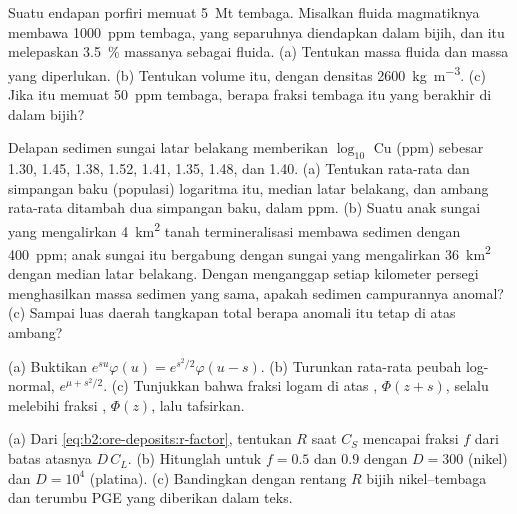 \begin{exercise}[$\star\star$]\label{exo:b2:ore-deposits:8}
Suatu endapan porfiri memuat \qty{5}{Mt} tembaga. Misalkan fluida magmatiknya membawa \qty{1000}{ppm}
tembaga, yang separuhnya diendapkan dalam bijih, dan  itu melepaskan \qty{3.5}{\percent}
massanya sebagai fluida. (a) Tentukan massa fluida dan massa  yang diperlukan. (b) Tentukan volume
 itu, dengan densitas \qty{2600}{kg.m^{-3}}. (c) Jika  itu memuat \qty{50}{ppm} tembaga, berapa fraksi
tembaga itu yang berakhir di dalam bijih?
\end{exercise}

\begin{exercise}[$\star\star$]\label{exo:b2:ore-deposits:9}
Delapan sedimen sungai latar belakang memberikan $\log_{10}$ Cu (ppm) sebesar 1.30, 1.45, 1.38, 1.52, 1.41, 1.35,
1.48, dan 1.40. (a) Tentukan rata-rata dan simpangan baku (populasi) logaritma itu, median
latar belakang, dan ambang rata-rata ditambah dua simpangan baku, dalam ppm. (b) Suatu anak sungai
yang mengalirkan \qty{4}{km^2} tanah termineralisasi membawa sedimen dengan \qty{400}{ppm}; anak sungai itu bergabung dengan sungai yang
mengalirkan \qty{36}{km^2} dengan median latar belakang. Dengan menganggap setiap kilometer persegi menghasilkan
massa sedimen yang sama, apakah sedimen campurannya anomal? (c) Sampai luas daerah tangkapan total berapa
anomali itu tetap di atas ambang?
\end{exercise}

\begin{exercise}[$\star\star\star$]\label{exo:b2:ore-deposits:10}
(a) Buktikan $e^{su}\varphi(u) = e^{s^2/2}\varphi(u - s)$. (b) Turunkan rata-rata peubah
log-normal, $e^{\mu + s^2/2}$. (c) Tunjukkan bahwa fraksi logam di atas ,
$\Phi(z + s)$, selalu melebihi fraksi , $\Phi(z)$, lalu tafsirkan.
\end{exercise}

\begin{exercise}[$\star\star\star$]\label{exo:b2:ore-deposits:11}
(a) Dari \eqref{eq:b2:ore-deposits:r-factor}, tentukan $R$ saat $C_S$ mencapai fraksi $f$
dari batas atasnya $D\,C_L$. (b) Hitunglah untuk $f = 0.5$ dan $0.9$ dengan $D = 300$ (nikel) dan $D =
10^4$ (platina). (c) Bandingkan dengan rentang $R$ bijih nikel--tembaga dan terumbu PGE yang diberikan
dalam teks.
\end{exercise}

